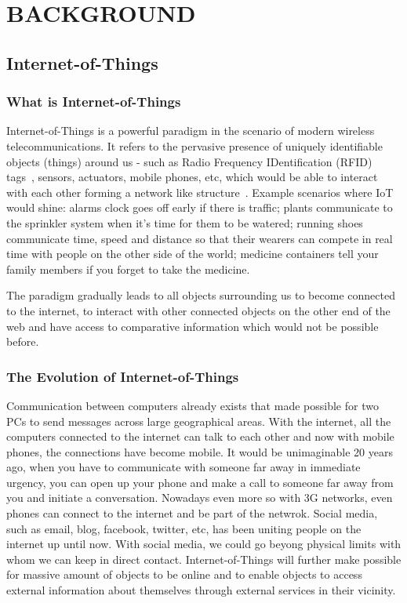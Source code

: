 \cleardoublepage
\singlespacing
\chapter{BACKGROUND}
\label{c:background}
\doublespacing\nointerlineskip

\section{Internet-of-Things}

\subsection{What is Internet-of-Things}

Internet-of-Things is a powerful paradigm in the scenario of modern wireless
telecommunications. It refers to the pervasive presence of uniquely identifiable
objects (things) around us - such as Radio Frequency IDentification (RFID)
tags~\cite{Shepard2005}, sensors, actuators, mobile phones, etc, which would be
able to interact with each other forming a network like
structure~\cite{Atzori20102787}. Example scenarios where IoT would shine: alarms
clock goes off early if there is traffic; plants communicate to the sprinkler
system when it's time for them to be watered; running shoes communicate time,
speed and distance so that their wearers can compete in real time with people on
the other side of the world; medicine containers tell your family members if you
forget to take the medicine.

The paradigm gradually leads to all objects surrounding us to become connected
to the internet, to interact with other connected objects on the other end of
the web and have access to comparative information which would not be possible
before.

\subsection{The Evolution of Internet-of-Things}

Communication between computers already exists that made possible for two PCs to
send messages across large geographical areas. With the internet, all the
computers connected to the internet can talk to each other and now with mobile
phones, the connections have become mobile.
It would be unimaginable 20 years ago, when you have to communicate with someone
far away in immediate urgency, you can open up your phone and make a call to
someone far away from you and initiate a conversation. Nowadays even more so
with 3G networks, even phones can connect to the internet and be part of the
netwrok.
Social media, such as email, blog, facebook, twitter, etc, has been uniting
people on the internet up until now. With social media, we could go beyong
physical limits with whom we can keep in direct contact. Internet-of-Things will
further make possible for massive amount of objects to be online and to enable
objects to access external information about themselves through external
services in their vicinity.~\cite{Associati2011a}

